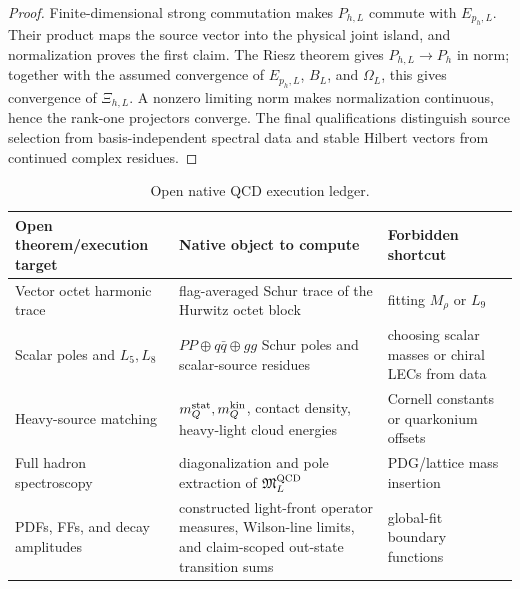 \documentclass[12pt,a4paper]{article}
\begin{document}
\begin{proof}
Finite-dimensional strong commutation makes \(P_{h,L}\) commute with
\(E_{p_h,L}\).  Their product maps the source vector into the physical joint
island, and normalization proves the first claim.  The Riesz theorem gives
\(P_{h,L}\to P_h\) in norm; together with the assumed convergence of
\(E_{p_h,L}\), \(B_L\), and \(\Omega_L\), this gives convergence of
\(\Xi_{h,L}\).  A nonzero limiting norm makes normalization continuous, hence
the rank-one projectors converge.  The final qualifications distinguish
source selection from basis-independent spectral data and stable Hilbert
vectors from continued complex residues.
\end{proof}


\begin{table}[htbp]
\centering
\footnotesize
\begin{tabular}{>{\raggedright\arraybackslash}p{} >{\raggedright\arraybackslash}p{} >{\raggedright\arraybackslash}p{}}
\toprule
Open theorem/execution target & Native object to compute & Forbidden shortcut \\
\midrule
Vector octet harmonic trace & flag-averaged Schur trace of the Hurwitz octet block & fitting \(M_\rho\) or \(L_9\) \\
Scalar poles and \(L_5,L_8\) & \(PP\oplus q\bar q\oplus gg\) Schur poles and scalar-source residues & choosing scalar masses or chiral LECs from data \\
Heavy-source matching & \(m_Q^{\rm stat},m_Q^{\rm kin}\), contact density, heavy-light cloud energies & Cornell constants or quarkonium offsets \\
Full hadron spectroscopy & diagonalization and pole extraction of \(\mathfrak M_L^{\rm QCD}\) & PDG/lattice mass insertion \\
PDFs, FFs, and decay amplitudes & constructed light-front operator measures, Wilson-line limits, and claim-scoped out-state transition sums & global-fit boundary functions \\
\bottomrule
\end{tabular}
\caption[Open native QCD execution ledger]{Open native QCD execution ledger.}
\label{p11:tab:open-native-qcd-execution-ledger}
\end{table}


\end{document}
